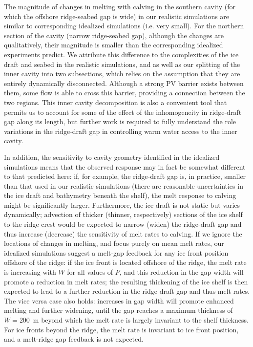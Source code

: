 \documentclass[draft]{agujournal2019}
\begin{document}
The magnitude of changes in melting with calving in the southern cavity (for which the offshore ridge-seabed gap is wide) in our realistic simulations are similar to corresponding idealized simulations (i.e. very small). For the northern section of the cavity (narrow ridge-seabed gap), although the changes are qualitatively, their magnitude is smaller than the corresponding idealized experiments predict. We attribute this difference to the complexities of the ice draft and seabed in the realistic simulations, and as well as our splitting of the inner cavity into two subsections, which relies on the assumption that they are entirely dynamically disconnected. Although a strong PV barrier exists between them, some flow is able to cross this barrier, providing a connection between the two regions. This inner cavity decomposition is also a convenient tool that permits us to account for some of the effect of the inhomogeneity in ridge-draft gap along its length, but further work is required to fully understand the role variations in the ridge-draft gap in controlling warm water access to the inner cavity.

In addition, the sensitivity to cavity geometry identified in the idealized simulations means that the observed response may in fact be somewhat different to that predicted here: if, for example, the ridge-draft gap is, in practice, smaller than that used in our realistic simulations (there are reasonable uncertainties in the ice draft and bathymetry beneath the shelf), the melt response to calving might be significantly larger. Furthermore, the ice draft is not static but varies dynamically; advection of thicker (thinner, respectively) sections of the ice shelf to the ridge crest would be expected to narrow (widen) the ridge-draft gap and thus increase (decrease) the sensitivity of melt rates to calving. If we ignore the locations of changes in melting, and focus purely on mean melt rates, our idealized simulations suggest a melt-gap feedback for any ice front position offshore of the ridge: if the ice front is located offshore of the ridge, the melt rate is increasing with $W$ for all values of $P$, and this reduction in the gap width will promote a reduction in melt rates; the resulting thickening of the ice shelf is then expected to lead to a further reduction in the ridge-draft gap and thus melt rates. The vice versa case also holds: increases in gap width will promote enhanced melting and further widening, until the gap reaches a maximum thickness of $W=200$~m beyond which the melt rate is largely invariant to the shelf thickness. For ice fronts beyond the ridge, the melt rate is invariant to ice front position, and a melt-ridge gap feedback is not expected.
\end{document}
